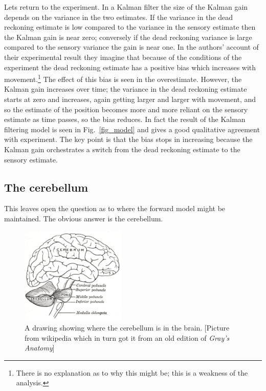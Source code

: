 \documentclass[12pt]{article}
\begin{document}
Lets return to the experiment. In a Kalman filter the size of the
Kalman gain depends on the variance in the two estimates. If the
variance in the dead reckoning estimate is low compared to the
variance in the sensory estimate then the Kalman gain is near zero;
conversely if the dead reckoning variance is large compared to the
sensory variance the gain is near one. In the authors' account of
their experimental result they imagine that because of the conditions
of the experiment the dead reckoning estimate has a positive bias
which increases with movement.\footnote{There is no explanation as to
  why this might be; this is a weakness of the analysis.} The effect
of this bias is seen in the overestimate. However, the Kalman gain
increases over time; the variance in the dead reckoning estimate
starts at zero and increases, again getting larger and larger with
movement, and so the estimate of the position becomes more and more
reliant on the sensory estimate as time passes, so the bias
reduces. In fact the result of the Kalman filtering model is seen in
Fig.~\ref{fig_model} and gives a good qualitative agreement with
experiment. The key point is that the bias stops in increasing because
the Kalman gain orchestrates a switch from the dead reckoning estimate
to the sensory estimate.

\subsection*{The cerebellum}

This leaves open the question as to where the forward model might be
maintained. The obvious answer is the cerebellum.


\begin{figure}
\begin{center}
\includegraphics[width=5cm]{fig_gray.png}
\end{center}
\caption{A drawing showing where the cerebellum is in the brain. [Picture from wikipedia which in turn got it from an old edition of \textsl{Gray's Anatomy}]\label{fig_gray}}
\end{figure}
\end{document}
